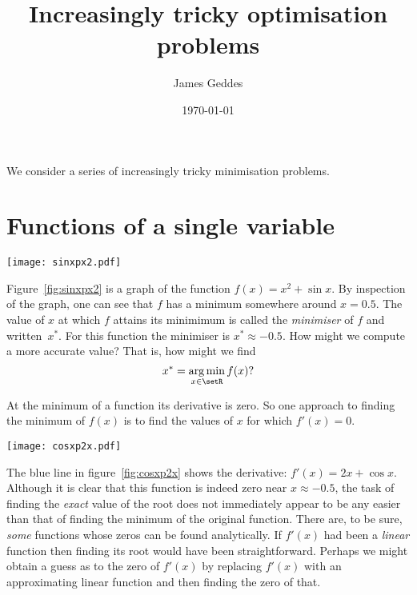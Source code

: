 \documentclass[10pt, a4paper]{article}
\title{Increasingly tricky optimisation problems}
\author{James Geddes}
\date{\today}
\DeclareMathOperator*{\argmin}{arg\,min}
\begin{document}
\maketitle

We consider a series of increasingly tricky minimisation
problems. 

\section{Functions of a single variable}\label{sec:univariate}
\begin{marginfigure}
  \centering
  \texttt{[image: sinxpx2.pdf]}
  \label{fig:sinxpx2}
\end{marginfigure}

Figure~\ref{fig:sinxpx2} is a graph of the function
$f(x) = x^2+\sin x$. By inspection of the graph, one can see that $f$
has a minimum somewhere around $x = 0.5$. The value of $x$ at which
$f$ attains its minimimum is called the \emph{minimiser} of $f$ and
written~$x^*$. For this function the minimiser is $x^* \approx -0.5$. How
might we compute a more accurate value? That is, how might we find
\begin{equation*}
  x^* = \argmin_{x\in\setR} f(x)?
\end{equation*}

At the minimum of a function its derivative is zero. So one approach
to finding the minimum of $f(x)$ is to find the values of $x$ for
which $f'(x)=0$.

\begin{marginfigure}
  \centering \texttt{[image: cosxp2x.pdf]} 
  \label{fig:cosxp2x}
\end{marginfigure}

The blue line in figure~\ref{fig:cosxp2x} shows the derivative:
$f'(x) = 2x+\cos x$. Although it is clear that this function is indeed
zero near $x\approx-0.5$, the task of finding the \emph{exact} value of the
root does not immediately appear to be any easier than that of finding
the minimum of the original function. There are, to be sure,
\emph{some} functions whose zeros can be found analytically. If
$f'(x)$ had been a \emph{linear} function then finding its root would
have been straightforward. Perhaps we might obtain a guess as to the
zero of $f'(x)$ by replacing $f'(x)$ with an approximating linear
function and then finding the zero of that.
\end{document}
